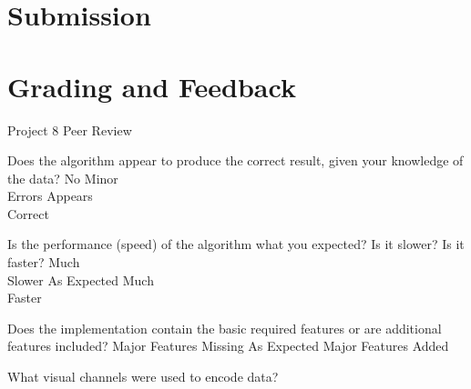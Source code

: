 \documentclass[a4paper,12pt]{article}
\begin{document}
\section{Submission}


\section{Grading and Feedback}

\feedback






\newpage


\begin{center}
{\huge Project 8 Peer Review}
\end{center}






	{Does the algorithm appear to produce the correct result, given your knowledge of the 
    	data?}
    {\choice No}
    {\choice Minor\\Errors}
    {\choice Appears\\Correct}
    
	{Is the performance (speed) of the algorithm what you expected? Is 
    	it slower? Is it faster?}
    {\choice Much\\Slower}
    {\choice As Expected}
    {\choice Much\\Faster}
    
	{Does the implementation contain the basic required 
    	features or are additional features included?}
    {\choice Major Features Missing}
    {\choice As Expected}
    {\choice Major Features Added} 
    
\EndTable


\vspace{15pt}



	{What visual channels were used to encode data? }
    { 
    }
        
\end{document}
